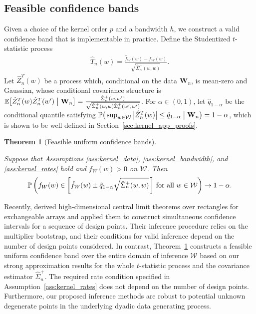 \documentclass[11pt,lof]{puthesis}
\renewcommand{\P}{\ensuremath{\mathbb{P}}}
\newcommand{\E}{\ensuremath{\mathbb{E}}}
\newcommand{\bW}{\ensuremath{\mathbf{W}}}
\newcommand{\cW}{\ensuremath{\mathcal{W}}}
\theoremstyle{break}
\newtheorem{theorem}{Theorem}[section]
\theoremstyle{proof}
\begin{document}
\subsection{Feasible confidence bands}
\label{sec:kernel_feasible_confidence_bands}

Given a choice of the kernel order $p$ and a bandwidth $h$, we construct a
valid confidence band that is implementable in practice. Define the Studentized
$t$-statistic process
%
\begin{align*}
\hat T_n(w) = \frac{\hat{f}_W(w) - f_W(w)}{\sqrt{\hat \Sigma_n^+(w,w)}}.
\end{align*}
%
Let $\hat Z_n^T(w)$ be a process which, conditional on the data $\bW_n$,
is mean-zero and Gaussian, whose conditional covariance structure is
$\E\big[ \hat Z_n^T(w) \hat Z_n^T(w') \bigm\vert \bW_n \big]
= \frac{\hat \Sigma_n^+(w,w')}
{\sqrt{\hat \Sigma_n^+(w,w) \hat \Sigma_n^+(w',w')}}$.
For $\alpha \in (0,1)$, let $\hat q_{1-\alpha}$ be the
conditional quantile satisfying
$\P\big(\sup_{w \in \cW} \big| \hat Z_n^T(w) \big| \leq \hat q_{1-\alpha}
\bigm\vert \bW_n \big) = 1 - \alpha$,
which is shown to be well defined in Section~\ref{sec:kernel_app_proofs}.

\begin{theorem}[Feasible uniform confidence bands]
\label{thm:kernel_ucb}

Suppose that Assumptions \ref{ass:kernel_data}, \ref{ass:kernel_bandwidth},
and \ref{ass:kernel_rates} hold and $f_W(w) > 0$ on $\cW$. Then
%
\begin{align*}
\P\left(
f_W(w) \in
\left[ \hat f_W(w) \pm \hat q_{1-\alpha}
\sqrt{\hat\Sigma_n^+(w,w)} \,\right]
\,\textup{for all } w \in \cW
\right) \to 1 - \alpha.
\end{align*}
%
\end{theorem}

Recently, \citet{chiang2022inference} derived high-dimensional central limit
theorems over rectangles for exchangeable arrays and applied them to construct
simultaneous confidence intervals for a sequence of design points. Their
inference procedure relies on the multiplier bootstrap, and their conditions
for valid inference depend on the number of design points considered. In
contrast, Theorem~\ref{thm:kernel_ucb} constructs a feasible uniform confidence
band over the entire domain of inference $\cW$ based on our strong
approximation results for the whole $t$-statistic process and the covariance
estimator $\hat\Sigma_n^+$. The required rate condition specified in
Assumption~\ref{ass:kernel_rates} does not depend on the number of design
points.
Furthermore, our proposed inference methods are robust to potential unknown
degenerate points in the underlying dyadic data generating process.
\end{document}
